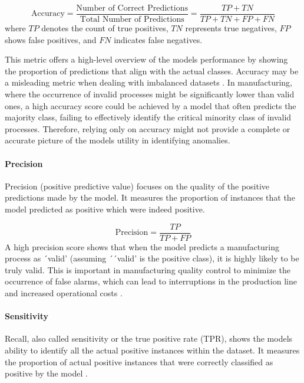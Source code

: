 \begin{equation}
  \label{eq:accuracy}
  \text{Accuracy} = \frac{\text{Number of Correct Predictions}}{\text{Total Number of Predictions}} = \frac{TP + TN}{TP + TN + FP + FN}
\end{equation}
where $TP$ denotes the count of true positives, $TN$ represents true negatives, $FP$ shows false positives, and $FN$ indicates false negatives.

This metric offers a high-level overview of the models performance by showing the proportion of predictions that align with the actual classes. Accuracy may be a misleading metric when dealing with imbalanced datasets \autocite{fahrmeir2016statistik}. In manufacturing, where the occurrence of invalid processes might be significantly lower than valid ones, a high accuracy score could be achieved by a model that often predicts the majority class, failing to effectively identify the critical minority class of invalid processes. Therefore, relying only on accuracy might not provide a complete or accurate picture of the models utility in identifying anomalies.

\paragraph{\textbf{Precision}}
Precision (positive predictive value) focuses on the quality of the positive predictions made by the model. It measures the proportion of instances that the model predicted as positive which were indeed positive.

\begin{equation}
  \label{eq:precision}
  \text{Precision} = \frac{TP}{TP + FP}
\end{equation}
A high precision score shows that when the model predicts a manufacturing process as ´valid' (assuming ´´valid' is the positive class), it is highly likely to be truly valid. This is important in manufacturing quality control to minimize the occurrence of false alarms, which can lead to interruptions in the production line and increased operational costs \autocite{kharitonov2022comparative}.

\paragraph{\textbf{Sensitivity}}
Recall, also called sensitivity or the true positive rate (TPR), shows the models ability to identify all the actual positive instances within the dataset. It measures the proportion of actual positive instances that were correctly classified as positive by the model \autocite{fahrmeir2016statistik}.

